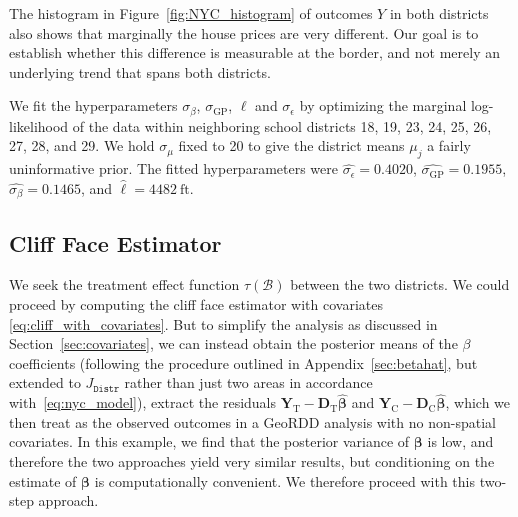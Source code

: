 \documentclass[letter,12pt]{article}
\newcommand{\district}{\mathtt{Distr}}
\newcommand{\treat}{\mathrm{T}}
\newcommand{\ctrol}{\mathrm{C}}
\newcommand{\sigmaf}{\sigma_{\mathrm{GP}}}
\newcommand{\sigman}{\sigma_{\epsilon}}
\newcommand{\sigmamu}{\sigma_{\mu}}
\newcommand{\Yvec}{\mathbold{Y}}
\newcommand{\yt}{\Yvec_{\treat}}
\newcommand{\yc}{\Yvec_{\ctrol}}
\newcommand{\betavec}{\mathbold{\beta}}
\newcommand{\border}{\mathcal{B}}
\newcommand{\Dmat}{\mathbold{D}}
\begin{document}
The histogram in Figure~\ref{fig:NYC_histogram} of outcomes \(Y\) in both districts also shows that marginally the house prices are very different.
Our goal is to establish whether this difference is measurable at the border, and not merely an underlying trend that spans both districts.

We fit the hyperparameters \(\sigma_\beta\), \(\sigmaf\), \(\ell\) and \(\sigman\) by optimizing the marginal log-likelihood of the data within neighboring school districts 18, 19, 23, 24, 25, 26, 27, 28, and 29.
We hold \(\sigmamu\) fixed to 20 to give the district means \(\mu_j\) a fairly uninformative prior.
The fitted hyperparameters were \(\widehat{\sigman}=0.4020\), \(\widehat{\sigmaf}=0.1955\), \(\widehat{\sigma_\beta}=0.1465\), and \(\widehat{\ell}=4482~\text{ft}\).

\hypertarget{cliff-face-estimator}{%
\subsection{Cliff Face Estimator}\label{cliff-face-estimator}}

We seek the treatment effect function \(\tau(\border)\) between the two districts.
We could proceed by computing the cliff face estimator with covariates \eqref{eq:cliff_with_covariates}.
But to simplify the analysis as discussed in Section~\ref{sec:covariates}, we can instead obtain the posterior means of the \(\beta\) coefficients (following the procedure outlined in Appendix~\ref{sec:betahat}, but extended to \(J_\district\) rather than just two areas in accordance with~\eqref{eq:nyc_model}), extract the residuals \(\yt{}-\Dmat_\treat{} \hat{\betavec}\) and \(\yc{}-\Dmat_\ctrol{} \hat{\betavec}\), which we then treat as the observed outcomes in a GeoRDD analysis with no non-spatial covariates.
In this example, we find that the posterior variance of \(\betavec\) is low, and therefore the two approaches yield very similar results, but conditioning on the estimate of \(\betavec\) is computationally convenient.
We therefore proceed with this two-step approach.
\end{document}
